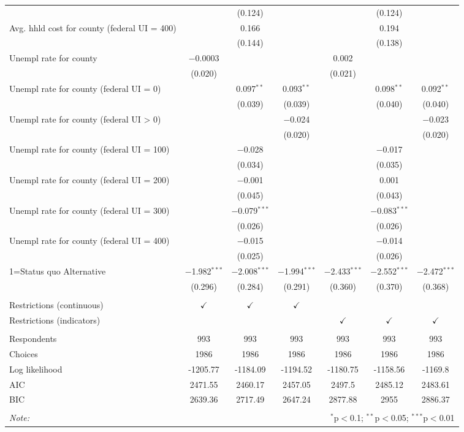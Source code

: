 \begin{table}[!htbp]
\begin{tabular}{@{\extracolsep{5pt}}lcccccc}
  &  & (0.124) &  &  & (0.124) &  \\ 
  Avg. hhld cost for county (federal UI = 400) &  & 0.166 &  &  & 0.194 &  \\ 
  &  & (0.144) &  &  & (0.138) &  \\ 
  Unempl rate for county & $-$0.0003 &  &  & 0.002 &  &  \\ 
  & (0.020) &  &  & (0.021) &  &  \\ 
  Unempl rate for county (federal UI = 0) &  & 0.097$^{**}$ & 0.093$^{**}$ &  & 0.098$^{**}$ & 0.092$^{**}$ \\ 
  &  & (0.039) & (0.039) &  & (0.040) & (0.040) \\ 
  Unempl rate for county (federal UI > 0) &  &  & $-$0.024 &  &  & $-$0.023 \\ 
  &  &  & (0.020) &  &  & (0.020) \\ 
  Unempl rate for county (federal UI = 100) &  & $-$0.028 &  &  & $-$0.017 &  \\ 
  &  & (0.034) &  &  & (0.035) &  \\ 
  Unempl rate for county (federal UI = 200) &  & $-$0.001 &  &  & 0.001 &  \\ 
  &  & (0.045) &  &  & (0.043) &  \\ 
  Unempl rate for county (federal UI = 300) &  & $-$0.079$^{***}$ &  &  & $-$0.083$^{***}$ &  \\ 
  &  & (0.026) &  &  & (0.026) &  \\ 
  Unempl rate for county (federal UI = 400) &  & $-$0.015 &  &  & $-$0.014 &  \\ 
  &  & (0.025) &  &  & (0.026) &  \\ 
  1=Status quo Alternative & $-$1.982$^{***}$ & $-$2.008$^{***}$ & $-$1.994$^{***}$ & $-$2.433$^{***}$ & $-$2.552$^{***}$ & $-$2.472$^{***}$ \\ 
  & (0.296) & (0.284) & (0.291) & (0.360) & (0.370) & (0.368) \\ 
 \hline \\[-1.8ex] 
Restrictions (continuous) & $\checkmark$ & $\checkmark$ & $\checkmark$ & & & \\ 
Restrictions (indicators) & & & & $\checkmark$ & $\checkmark$ & $\checkmark$ \\ 
\hline \\[-1.8ex]Respondents & 993 & 993 & 993 & 993 & 993 & 993\\ 
 Choices & 1986 & 1986 & 1986 & 1986 & 1986 & 1986\\
Log likelihood & -1205.77 & -1184.09 & -1194.52 & -1180.75 & -1158.56 & -1169.8 \\ 
AIC & 2471.55 & 2460.17 & 2457.05 & 2497.5 & 2485.12 & 2483.61 \\ 
BIC & 2639.36 & 2717.49 & 2647.24 & 2877.88 & 2955 & 2886.37 \\ 
 
\hline 
\hline \\[-1.8ex] 
\textit{Note:}  & \multicolumn{6}{r}{$^{*}$p$<$0.1; $^{**}$p$<$0.05; $^{***}$p$<$0.01} \\ 
\end{tabular} 
\end{table} 
